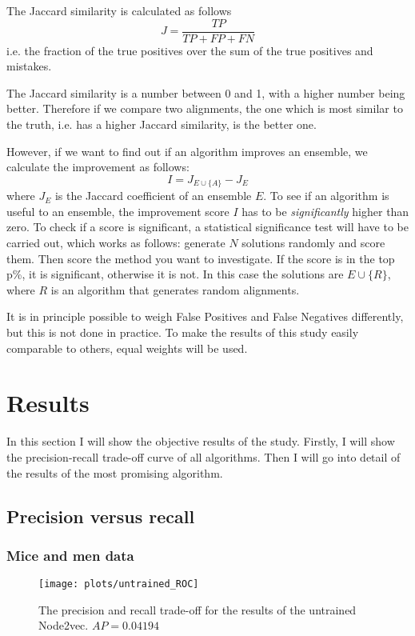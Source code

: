 \documentclass{article}
\begin{document}
 The Jaccard similarity is calculated as follows
 \[
 J = \frac{TP}{TP + FP + FN}
 \]
 i.e. the fraction of the true positives over the sum of the true positives and mistakes.
 
 The Jaccard similarity is a number between 0 and 1, with a higher number being better. Therefore if we compare two alignments, the one which is most similar to the truth, i.e. has a higher Jaccard similarity, is the better one.
 
 However, if we want to find out if an algorithm improves an ensemble, we calculate the improvement as follows:
 \[
 I = J_{E\cup \{A\}} - J_E
 \]
 where $J_E$ is the Jaccard coefficient of an ensemble $E$.
 To see if an algorithm is useful to an ensemble, the improvement score $I$ has to be \emph{significantly} higher than zero. To check if a score is significant, a statistical significance test will have to be carried out, which works as follows: generate $N$ solutions randomly and score them. Then score the method you want to investigate. If the score is in the top p\%, it is significant, otherwise it is not. In this case the solutions are $E\cup \{R\}$, where $R$ is an algorithm that generates random alignments\cite{fisher1925statistical}.
 
 It is in principle possible to weigh False Positives and False Negatives differently, but this is not done in practice. To make the results of this study easily comparable to others, equal weights will be used.
 
 \newpage
 \section{Results} \label{results}
 
 In this section I will show the objective results of the study. Firstly, I will show the precision-recall trade-off curve of all algorithms. Then I will go into detail of the results of the most promising algorithm.
 
 \subsection{Precision versus recall}
  \subsubsection{Mice and men data}
  \begin{figure}[H]
   \centering
   \texttt{[image: plots/untrained\_ROC]}
   \caption{The precision and recall trade-off for the results of the untrained Node2vec. $AP = 0.04194$}
   \label{ROC_untrained}
  \end{figure}
 
\end{document}

